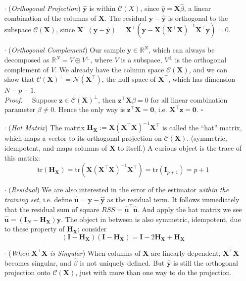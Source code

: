 \documentclass[a4paper, 11pt]{article}
\begin{document}
\begin{itemize}
	\item[$\cdot$] (\emph{Orthogonal Projection}) $\hat{\bm{y}}$ is within $\mathcal{C}(X)$, since $\hat{y}=\bm{X}\hat{\beta}$, a linear combination of the columns of $\bm{X}$. The residual $\bm{y}-\hat{\bm{y}}$ is orthogonal to the subspace $\mathcal{C}(\bm{X})$, since $\bm{X}^{\top}(\bm{y}-\hat{\bm{y}}) = \bm{X}^{\top}(\bm{y}-\bm{X}(\bm{X}^{\top} \bm{X})^{-1}\bm{X}^{\top} \bm{y}) = 0$.

	\item[$\cdot$] (\emph{Orthogonal Complement}) Our sample $\bm{y} \in \mathbb{R}^N$, which can always be decomposed as $\mathbb{R}^N = V \oplus V^{\perp}$, where $V$ is a subspace, $V^{\perp}$ is the orthogonal complement of $V$. We already have the column space $\mathcal{C}(\bm{X})$, and we can show that $\mathcal{C}(\bm{X})^{\perp} = \mathcal{N}(\bm{X}^{\top})$, the null space of $\bm{X}^{\top}$, which has dimension $N-p-1$. \\
	\textit{Proof.~~} Suppose $\bm{z} \in \mathcal{C}(\bm{X})^{\perp}$, then $\bm{z}^{\top} \bm{X}\beta =0$ for all linear combination parameter $\beta \ne 0$. Hence the only way is $\bm{z}^{\top} \bm{X} = \bm{0}$, i.e. $\bm{X}^{\top} \bm{z} = \bm{0}$. $\square$ \\

	\item[$\cdot$] (\emph{Hat Matrix}) The matrix $\bm{H}_{\bm{X}} := \bm{X}(\bm{X}^{\top} \bm{X})^{-1}\bm{X}^{\top}$ is called the ``hat'' matrix, which maps a vector to its orthogonal projection on $\mathcal{C}(\bm{X})$. (symmetric, idempotent, and maps columns of $\bm{X}$ to itself.) A curious object is the trace of this matrix:
	$$
	\text{tr}(\bm{H}_{\bm{X}}) = \text{tr}(\bm{X}(\bm{X}^{\top} \bm{X})^{-1}\bm{X}^{\top}) = \text{tr}(\bm{I}_{p+1}) = p+1
	$$

	\item[$\cdot$] (\emph{Residual}) We are also interested in the error of the estimator \emph{within the training set}, i.e. define $\hat{\bm{u}}=\bm{y}-\hat{\bm{y}}$ as the residual term. It follows immediately that the residual sum of square $RSS= \hat{\bm{u}}^{\top} \hat{\bm{u}}$. And apply the hat matrix we see $\hat{\bm{u}}=(\bm{I}_N-\bm{H}_{\bm{X}})\bm{y}$. The object in between is also symmetric, idempotent, due to these property of $\bm{H}_{\bm{X}}$; consider
	$$
	(\bm{I}-\bm{H}_{\bm{X}})(\bm{I}-\bm{H}_{\bm{X}}) = \bm{I}-2 \bm{H}_{\bm{X}} + \bm{H}_{\bm{X}}
	$$

	\item[$\cdot$] (\emph{When $\bm{X}^{\top} \bm{X}$ is Singular}) When columns of $\bm{X}$ are linearly dependent, $\bm{X}^{\top} \bm{X}$ becomes singular, and $\hat{\beta}$ is not uniquely defined. But $\hat{\bm{y}}$ is still the orthogonal projection onto $\mathcal{C}(\bm{X})$, just with more than one way to do the projection.
\end{itemize}
\end{document}
